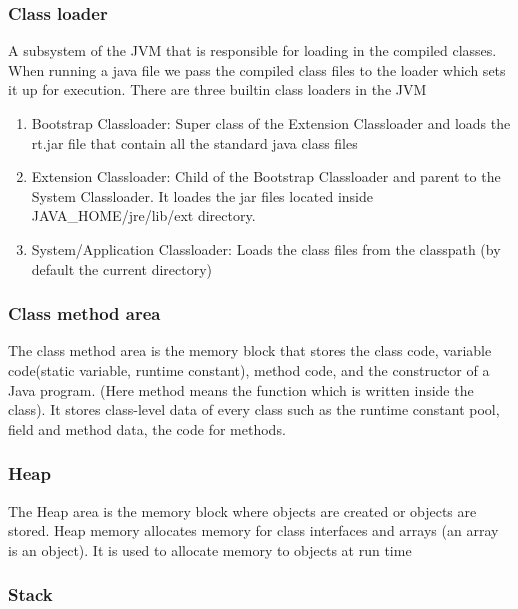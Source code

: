 \documentclass{article}
\begin{document}


\subsubsection{Class loader}

A subsystem of the JVM that is responsible for loading in the compiled classes. When running a java file we pass the compiled class files to the loader which sets it up for execution.
There are three builtin class loaders in the JVM
\begin{enumerate}
    \item Bootstrap Classloader: Super class of the Extension Classloader and loads the rt.jar file that contain all the standard java class files 
    \item Extension Classloader: Child of the Bootstrap Classloader and parent to the System Classloader. It loades the jar files located inside JAVA_HOME/jre/lib/ext directory.
    \item System/Application Classloader: Loads the class files from the classpath (by default the current directory)
\end{enumerate}

\subsubsection{Class method area}

The class method area is the memory block that stores the class code, variable code(static variable, runtime constant), method code, and the constructor of a Java program. (Here method means the function which is written inside the class).
It stores class-level data of every class such as the runtime constant pool, field and method data, the code for methods.

\subsubsection{Heap}

The Heap area is the memory block where objects are created or objects are stored. Heap memory allocates memory for class interfaces and arrays (an array is an object). It is used to allocate memory to objects at run time

\subsubsection{Stack}
\end{document}
